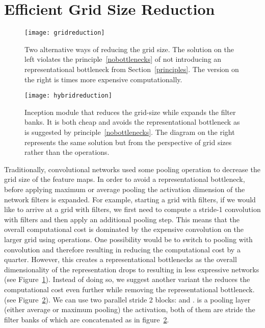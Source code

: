 \documentclass[10pt,twocolumn,letterpaper]{article}
\begin{document}
 \section{Efficient Grid Size Reduction}
\label{gridred}
\begin{figure}
\centering
\texttt{[image: gridreduction]}
\caption{Two alternative ways of reducing the grid size. The solution on the
  left violates the principle~\ref{nobottlenecks} of
  not introducing an representational bottleneck from Section~\ref{principles}.
  The version on the right is  times more expensive computationally.
}
\label{fig:gridreduction}
\end{figure}
\begin{figure}
\centering
\texttt{[image: hybridreduction]}
\caption{Inception module that reduces the grid-size while expands the filter
  banks. It is both cheap and avoids the representational bottleneck as is
  suggested by principle~\ref{nobottlenecks}. 
  The diagram on the right represents the same solution but from the
  perspective of grid sizes rather than the operations.}
\label{fig:hybridreduction}
\end{figure}
Traditionally, convolutional networks used some pooling operation to decrease
the grid size of the feature maps. In order to avoid a representational
bottleneck, before applying maximum or average pooling the activation
dimension of the network filters is expanded.
For example, starting a  grid
with  filters, if we would like to arrive at a
 grid with  filters,
we first need to compute a stride-1 convolution with 
filters and then apply an additional pooling step. This means that the overall
computational cost is dominated by the expensive convolution on the larger grid
using  operations. One possibility would be to switch to pooling with
convolution and therefore resulting in  reducing the
computational cost by a quarter. However, this creates a representational
bottlenecks as the overall dimensionality of the representation drops to
 resulting in less expressive networks (see
Figure~\ref{fig:gridreduction}).
Instead of doing so, we suggest another variant the reduces the computational
cost even further while removing the representational bottleneck.
(see Figure~\ref{fig:hybridreduction}).
We can use two parallel stride 2 blocks:  and .  is a pooling layer
(either average or maximum pooling) the activation, both of them are stride
 the filter banks of which are concatenated as in
figure~\ref{fig:hybridreduction}.
\end{document}
